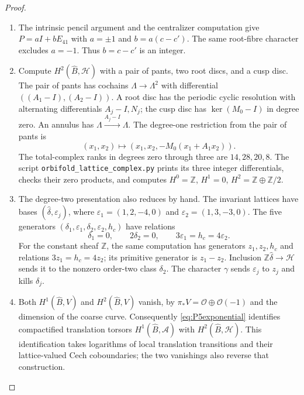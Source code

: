 \begin{proof}
\begin{enumerate}[label=\arabic*.,leftmargin=*]
\item The intrinsic pencil argument and the centralizer computation give
$P=aI+bE_{41}$ with $a=\pm1$ and $b=a(c-c')$.  The same root-fibre
character excludes $a=-1$.  Thus $b=c-c'$ is an integer.

\item Compute $H^2(\widehat B,\mathcal H)$ with a pair of pants, two root discs,
and a cusp disc.  The pair of pants has cochains $\Lambda\to\Lambda^2$
with differential $((A_1-I),(A_2-I))$.  A root disc has the periodic
cyclic resolution with alternating differentials $A_j-I,N_j$; the
cusp disc has $\ker(M_0-I)$ in degree zero.  An annulus has
$\Lambda\xrightarrow{A_j-I}\Lambda$.  The degree-one restriction from
the pair of pants is
\[
 (x_1,x_2)\longmapsto(x_1,x_2,-M_0(x_1+A_1x_2)).
\]
The total-complex ranks in degrees zero through three are $14,28,20,8$.
The script \texttt{orbifold\_lattice\_complex.py} prints its three
integer differentials, checks their zero products, and computes
$H^0=\mathbb Z$, $H^1=0$, $H^2=\mathbb Z\oplus\mathbb Z/2$.

\item The degree-two presentation also reduces by hand.  The invariant
lattices have bases $(\widehat\delta,\varepsilon_j)$, where
$\varepsilon_1=(1,2,-4,0)$ and $\varepsilon_2=(1,3,-3,0)$.
The five generators $(\delta_1,\varepsilon_1,\delta_2,\varepsilon_2,h_c)$
have relations
\begin{equation}\label{eq:P5H2}
 \delta_1=0,\qquad 2\delta_2=0,\qquad
 3\varepsilon_1=h_c=4\varepsilon_2.
\end{equation}
For the constant sheaf $\mathbb Z$, the same computation has generators
$z_1,z_2,h_c$ and relations $3z_1=h_c=4z_2$; its primitive generator is
$z_1-z_2$.  Inclusion $\mathbb Z\widehat\delta\to\mathcal H$ sends it
to the nonzero order-two class $\delta_2$.  The character $\gamma$
sends $\varepsilon_j$ to $z_j$ and kills $\delta_j$.

\item Both $H^1(\widehat B,V)$ and $H^2(\widehat B,V)$ vanish, by
$\pi_*V=\mathcal O\oplus\mathcal O(-1)$ and the dimension of the coarse
curve.  Consequently \eqref{eq:P5exponential} identifies compactified
translation torsors $H^1(\widehat B,\mathcal A)$ with
$H^2(\widehat B,\mathcal H)$.  This identification takes logarithms of
local translation transitions and their lattice-valued Cech
coboundaries; the two vanishings also reverse that construction.


\end{enumerate}
\end{proof}
